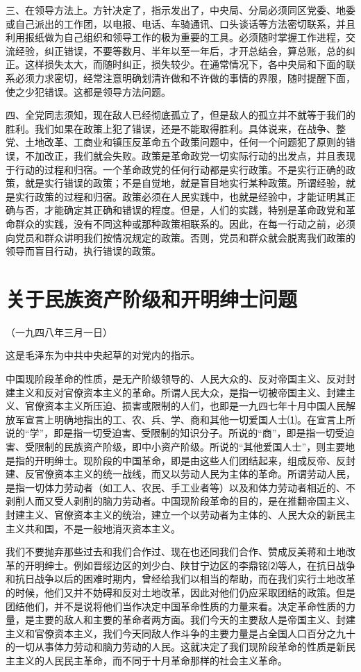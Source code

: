 \documentclass[UTF-8, a5paper, 12pt]{ctexart}
\begin{document}
三、在领导方法上。方针决定了，指示发出了，中央局、分局必须同区党委、地委或自己派出的工作团，以电报、电话、车骑通讯、口头谈话等方法密切联系，并且利用报纸做为自己组织和领导工作的极为重要的工具。必须随时掌握工作进程，交流经验，纠正错误，不要等数月、半年以至一年后，才开总结会，算总账，总的纠正。这样损失太大，而随时纠正，损失较少。在通常情况下，各中央局和下面的联系必须力求密切，经常注意明确划清许做和不许做的事情的界限，随时提醒下面，使之少犯错误。这都是领导方法问题。

四、全党同志须知，现在敌人已经彻底孤立了，但是敌人的孤立并不就等于我们的胜利。我们如果在政策上犯了错误，还是不能取得胜利。具体说来，在战争、整党、土地改革、工商业和镇压反革命五个政策问题中，任何一个问题犯了原则的错误，不加改正，我们就会失败。政策是革命政党一切实际行动的出发点，并且表现于行动的过程和归宿。一个革命政党的任何行动都是实行政策。不是实行正确的政策，就是实行错误的政策；不是自觉地，就是盲目地实行某种政策。所谓经验，就是实行政策的过程和归宿。政策必须在人民实践中，也就是经验中，才能证明其正确与否，才能确定其正确和错误的程度。但是，人们的实践，特别是革命政党和革命群众的实践，没有不同这种或那种政策相联系的。因此，在每一行动之前，必须向党员和群众讲明我们按情况规定的政策。否则，党员和群众就会脱离我们政策的领导而盲目行动，执行错误的政策。 

\section{关于民族资产阶级和开明绅士问题}

（一九四八年三月一日）

这是毛泽东为中共中央起草的对党内的指示。

中国现阶段革命的性质，是无产阶级领导的、人民大众的、反对帝国主义、反对封建主义和反对官僚资本主义的革命。所谓人民大众，是指一切被帝国主义、封建主义、官僚资本主义所压迫、损害或限制的人们，也即是一九四七年十月中国人民解放军宣言上明确地指出的工、农、兵、学、商和其他一切爱国人士⑴。在宣言上所说的“学”，即是指一切受迫害、受限制的知识分子。所说的“商”，即是指一切受迫害、受限制的民族资产阶级，即中小资产阶级。所说的“其他爱国人士”，则主要地是指的开明绅士。现阶段的中国革命，即是由这些人们团结起来，组成反帝、反封建、反官僚资本主义的统一战线，而又以劳动人民为主体的革命。所谓劳动人民，是指一切体力劳动者（如工人、农民、手工业者等）以及和体力劳动者相近的、不剥削人而又受人剥削的脑力劳动者。中国现阶段革命的目的，是在推翻帝国主义、封建主义、官僚资本主义的统治，建立一个以劳动者为主体的、人民大众的新民主主义共和国，不是一般地消灭资本主义。

我们不要抛弃那些过去和我们合作过、现在也还同我们合作、赞成反美蒋和土地改革的开明绅士。例如晋绥边区的刘少白、陕甘宁边区的李鼎铭⑵等人，在抗日战争和抗日战争以后的困难时期内，曾经给我们以相当的帮助，而在我们实行土地改革的时候，他们又并不妨碍和反对土地改革，因此对他们仍应采取团结的政策。但是团结他们，并不是说将他们当作决定中国革命性质的力量来看。决定革命性质的力量，是主要的敌人和主要的革命者两方面。我们今天的主要敌人是帝国主义、封建主义和官僚资本主义，我们今天同敌人作斗争的主要力量是占全国人口百分之九十的一切从事体力劳动和脑力劳动的人民。这就决定了我们现阶段革命的性质是新民主主义的人民民主革命，而不同于十月革命那样的社会主义革命。
\end{document}

